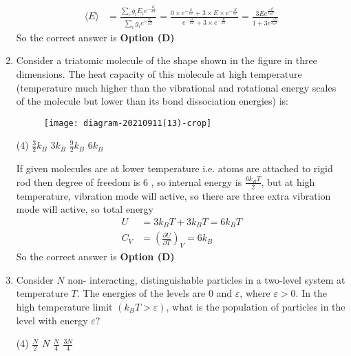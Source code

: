 \begin{enumerate}
\begin{tasks}
\end{tasks}
\begin{answer}
\begin{align*}
\langle E\rangle&=\frac{\sum_{i} g_{i} E_{i} e^{-\frac{E_{i}}{k T}}}{\sum_{i} g_{i} e^{-\frac{E_{i}}{k T}}}=\frac{0 \times e^{-\frac{0}{k T}}+3 \times E \times e^{-\frac{E}{k T}}}{e^{-\frac{0}{k T}}+3 \times e^{-\frac{E}{k T}}}=\frac{3 E e^{\frac{-E}{k_{B} T}}}{1+3 e^{\frac{-E}{k_{B} T}}}
\end{align*}
So the correct answer is \textbf{Option (D)}
\end{answer}	
\item Consider a triatomic molecule of the shape shown in the figure in three dimensions. The heat capacity of this molecule at high temperature (temperature much higher than the vibrational and rotational energy scales of the molecule but lower than its bond dissociation energies) is:
{}
\begin{figure}[H]
\centering
\texttt{[image: diagram-20210911(13)-crop]}
\end{figure}
\begin{tasks}(4)
\task[\textbf{A.}] $\frac{3}{2} k_{B}$
\task[\textbf{B.}] $3 k_{B}$
\task[\textbf{C.}] $\frac{9}{2} k_{B}$
\task[\textbf{D.}] $6 k_{B}$
\end{tasks}
\begin{answer}
If given molecules are at lower temperature i.e. atoms are attached to rigid rod then degree of freedom is 6 , so internal energy is $\frac{6 k_{B} T}{2}$, but at high temperature, vibration mode will active, so there are three extra vibration mode will active, so total energy
\begin{align*}
U&=3 k_{B} T+3 k_{B} T=6 k_{B} T\\
C_{V}&=\left(\frac{\partial U}{\partial T}\right)_{V}=6 k_{B}
\end{align*}
So the correct answer is \textbf{Option (D)}
\end{answer}	
\item Consider $N$ non- interacting, distinguishable particles in a two-level system at temperature $T$. The energies of the levels are 0 and $\varepsilon$, where $\varepsilon>0$. In the high temperature limit $\left(k_{B} T>\varepsilon\right)$, what is the population of particles in the level with energy $\varepsilon ?$
{}
\begin{tasks}(4)
\task[\textbf{A.}] $\frac{N}{2}$
\task[\textbf{B.}] $N$
\task[\textbf{C.}] $\frac{N}{4}$
\task[\textbf{D.}] $\frac{3 N}{4}$

\end{tasks}
\end{enumerate}
